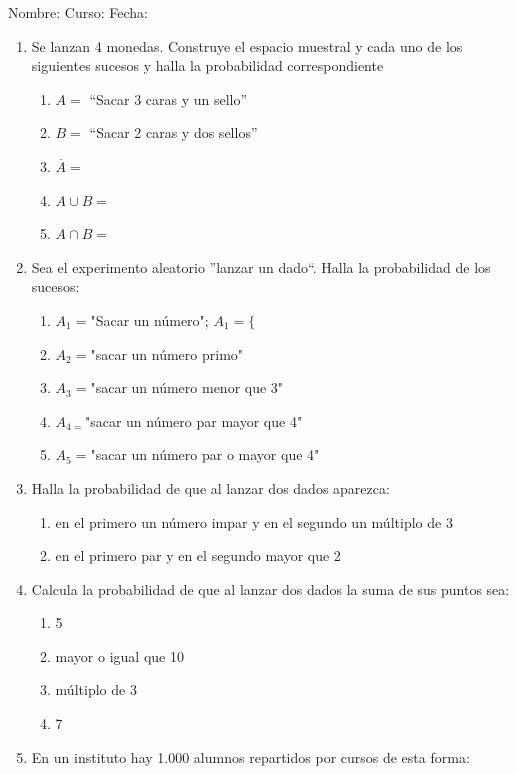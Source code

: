 \documentclass[fleqn]{article}
\newcommand{\LineaNombre}{%
\par
\vspace{\baselineskip}
Nombre:\hrulefill \; Curso: \underline{\hspace*{48pt}} \; Fecha: \underline{\hspace*{2.5cm}} \relax
\par}
\begin{document}
\LineaNombre
\begin{enumerate}
 \item Se lanzan 4 monedas. Construye el espacio muestral y cada uno de los siguientes sucesos y halla la probabilidad correspondiente
 \begin{enumerate}
 \item $A=$ ``Sacar 3 caras y un sello'' \noanswer
 \item $B=$ ``Sacar 2 caras y dos sellos'' \noanswer
 \item $\overline{A}=$ \noanswer
 \item $A\cup B=$ \noanswer
 \item $A\cap B=$ \noanswer
 \end{enumerate}
 \item Sea el experimento aleatorio ''lanzar un dado``. Halla la probabilidad de los sucesos:
\begin{enumerate}
\item $A_{1}=$"Sacar un número"; $A_{1}=\{$ \noanswer
\item $A_{2}=$"sacar un número primo" \noanswer
\item $A_{3}=$"sacar un número menor que 3" \noanswer
\item $A_{4=}$"sacar un número par mayor que 4" \noanswer
\item $A_{5}=$"sacar un número par o mayor que 4"\noanswer
\end{enumerate}
\item Halla la probabilidad de que al lanzar dos dados aparezca:
\begin{enumerate}
  \item en el primero un número impar y en el segundo un múltiplo de 3 \noanswer
  \newpage
\item en el primero par y en el segundo mayor que 2 \noanswer
\end{enumerate}
\item Calcula la probabilidad de que al lanzar dos dados la suma de sus puntos sea:
\begin{enumerate}
\item 5 \noanswer
\item mayor o igual que 10 \noanswer
\item múltiplo de 3 \noanswer
\item 7 \noanswer
\end{enumerate}
\item En un instituto hay 1.000 alumnos repartidos por cursos de esta forma:


\end{enumerate}
\end{document}
